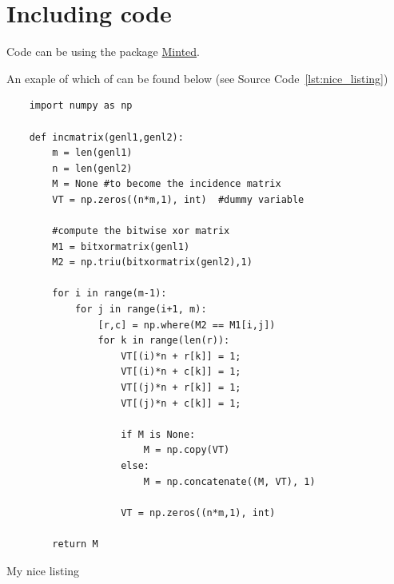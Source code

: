 \section{Including code}

Code can be using the package
\href{https://www.sharelatex.com/learn/Code\_Highlighting\_with\_minted}{Minted}.

An exaple of which of can be found below (see Source Code~\ref{lst:nice_listing})
\begin{listing}
	\begin{verbatim} 
	import numpy as np
	
	def incmatrix(genl1,genl2):
	    m = len(genl1)
	    n = len(genl2)
	    M = None #to become the incidence matrix
	    VT = np.zeros((n*m,1), int)  #dummy variable
	
	    #compute the bitwise xor matrix
	    M1 = bitxormatrix(genl1)
	    M2 = np.triu(bitxormatrix(genl2),1)
	
	    for i in range(m-1):
	        for j in range(i+1, m):
	            [r,c] = np.where(M2 == M1[i,j])
	            for k in range(len(r)):
	                VT[(i)*n + r[k]] = 1;
	                VT[(i)*n + c[k]] = 1;
	                VT[(j)*n + r[k]] = 1;
	                VT[(j)*n + c[k]] = 1;
	
	                if M is None:
	                    M = np.copy(VT)
	                else:
	                    M = np.concatenate((M, VT), 1)
	
	                VT = np.zeros((n*m,1), int)
	
	    return M
	\end{verbatim}

  \caption{My nice listing}
  \label{lst:nice_listing}
\end{listing}
